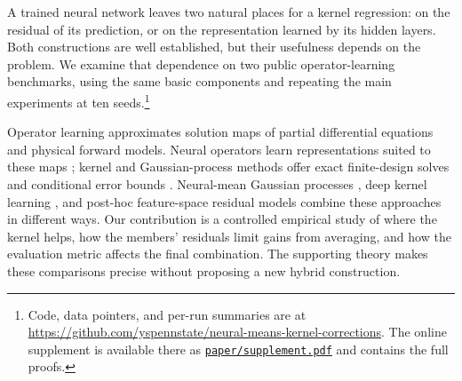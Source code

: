 A trained neural network leaves two natural places for a kernel regression: on the residual of its prediction, or on the representation learned by its hidden layers. Both constructions are well established, but their usefulness depends on the problem. We examine that dependence on two public operator-learning benchmarks, using the same basic components and repeating the main experiments at ten seeds.\footnote{Code, data pointers, and per-run summaries are at \url{https://github.com/yspennstate/neural-means-kernel-corrections}. The online supplement is available there as \href{https://github.com/yspennstate/neural-means-kernel-corrections/blob/main/paper/supplement.pdf}{\texttt{paper/supplement.pdf}} and contains the full proofs.}

Operator learning approximates solution maps of partial differential equations and physical forward models. Neural operators learn representations suited to these maps \citep{kovachki2023neural,lu2021deeponet,li2021fourier}; kernel and Gaussian-process methods offer exact finite-design solves and conditional error bounds \citep{batlle2024kernel,mora2025operator,owhadi2019operator}. Neural-mean Gaussian processes \citep{mora2025operator}, deep kernel learning \citep{wilson2016deep,calandra2016manifold}, and post-hoc feature-space residual models \citep{vendrell2026geometry} combine these approaches in different ways. Our contribution is a controlled empirical study of where the kernel helps, how the members' residuals limit gains from averaging, and how the evaluation metric affects the final combination. The supporting theory makes these comparisons precise without proposing a new hybrid construction.

